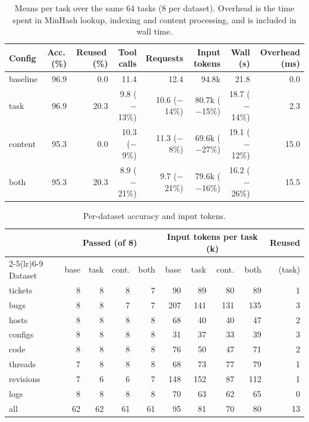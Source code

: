 \documentclass[11pt]{article}
\begin{document}
\begin{table}[H]
\centering\footnotesize\setlength{\tabcolsep}{4pt}
\begin{tabular}{lrrrrrrr}
\toprule
Config & Acc.\,(\%) & Reused\,(\%) & Tool calls & Requests & Input tokens & Wall (s) & Overhead (ms) \\
\midrule
baseline & 96.9 & 0.0 & 11.4 & 12.4 & 94.8k & 21.8 & 0.0 \\
task & 96.9 & 20.3 & 9.8 ($-$13\%) & 10.6 ($-$14\%) & 80.7k ($-$15\%) & 18.7 ($-$14\%) & 2.3 \\
content & 95.3 & 0.0 & 10.3 ($-$9\%) & 11.3 ($-$8\%) & 69.6k ($-$27\%) & 19.1 ($-$12\%) & 15.0 \\
both & 95.3 & 20.3 & 8.9 ($-$21\%) & 9.7 ($-$21\%) & 79.6k ($-$16\%) & 16.2 ($-$26\%) & 15.5 \\
\bottomrule
\end{tabular}
\caption{Means per task over the same 64 tasks (8 per dataset). Overhead is the time spent in
MinHash lookup, indexing and content processing, and is included in wall time.}
\label{tab:overall}
\end{table}

\begin{table}[H]
\centering\small
\begin{tabular}{lrrrrrrrrr}
\toprule
 & \multicolumn{4}{c}{Passed (of 8)} & \multicolumn{4}{c}{Input tokens per task (k)} & Reused \\
\cmidrule(lr){2-5}\cmidrule(lr){6-9}
Dataset & base & task & cont. & both & base & task & cont. & both & (task) \\
\midrule
tickets & 8 & 8 & 8 & 7 & 90 & 89 & 80 & 89 & 1 \\
bugs & 8 & 8 & 7 & 7 & 207 & 141 & 131 & 135 & 3 \\
hosts & 8 & 8 & 8 & 8 & 68 & 40 & 40 & 47 & 2 \\
configs & 8 & 8 & 8 & 8 & 31 & 37 & 33 & 39 & 3 \\
code & 8 & 8 & 8 & 8 & 76 & 50 & 47 & 71 & 2 \\
threads & 7 & 8 & 8 & 8 & 68 & 73 & 77 & 79 & 1 \\
revisions & 7 & 6 & 6 & 7 & 148 & 152 & 87 & 112 & 1 \\
logs & 8 & 8 & 8 & 8 & 70 & 63 & 62 & 65 & 0 \\
\midrule
all & 62 & 62 & 61 & 61 & 95 & 81 & 70 & 80 & 13 \\
\bottomrule
\end{tabular}
\caption{Per-dataset accuracy and input tokens.}
\label{tab:datasets}
\end{table}
\end{document}
